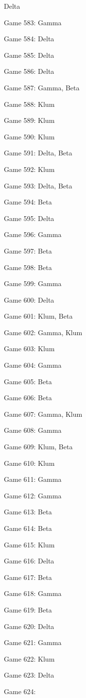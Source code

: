 \documentclass{article}
\begin{document}
\begin{multicols}{3}
\begin{compactitem}
Delta
\item Game 583:
Gamma
\item Game 584:
Delta
\item Game 585:
Delta
\item Game 586:
Delta
\item Game 587:
Gamma, Beta
\item Game 588:
Klum
\item Game 589:
Klum
\item Game 590:
Klum
\item Game 591:
Delta, Beta
\item Game 592:
Klum
\item Game 593:
Delta, Beta
\item Game 594:
Beta
\item Game 595:
Delta
\item Game 596:
Gamma
\item Game 597:
Beta
\item Game 598:
Beta
\item Game 599:
Gamma
\item Game 600:
Delta
\item Game 601:
Klum, Beta
\item Game 602:
Gamma, Klum
\item Game 603:
Klum
\item Game 604:
Gamma
\item Game 605:
Beta
\item Game 606:
Beta
\item Game 607:
Gamma, Klum
\item Game 608:
Gamma
\item Game 609:
Klum, Beta
\item Game 610:
Klum
\item Game 611:
Gamma
\item Game 612:
Gamma
\item Game 613:
Beta
\item Game 614:
Beta
\item Game 615:
Klum
\item Game 616:
Delta
\item Game 617:
Beta
\item Game 618:
Gamma
\item Game 619:
Beta
\item Game 620:
Delta
\item Game 621:
Gamma
\item Game 622:
Klum
\item Game 623:
Delta
\item Game 624:

\end{compactitem}
\end{multicols}
\end{document}
